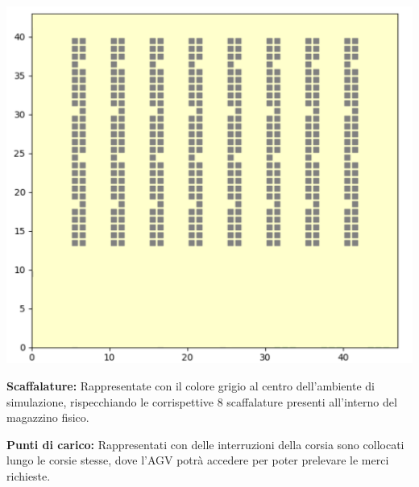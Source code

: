 \documentclass[12pt]{article}
\begin{document}
\begin{minipage}[ht]{0.45\linewidth}
\centering
\includegraphics[width=\textwidth]{Figures/Map/Corsie.png}
\end{minipage}

\begin{minipage}[ht]{0.45\linewidth}
\vspace{0.2cm}
\textbf{Scaffalature:} Rappresentate con il colore grigio al centro dell'ambiente di simulazione, rispecchiando le corrispettive 8 scaffalature presenti all'interno del magazzino fisico.
\end{minipage}
\hspace{0.5cm}
\begin{minipage}[ht]{0.45\linewidth}
\vspace{0.2cm}
\textbf{Punti di carico:} Rappresentati con delle interruzioni della corsia sono collocati lungo le corsie stesse, dove l'AGV potrà accedere per poter prelevare le merci richieste.
\end{minipage}
\end{document}
